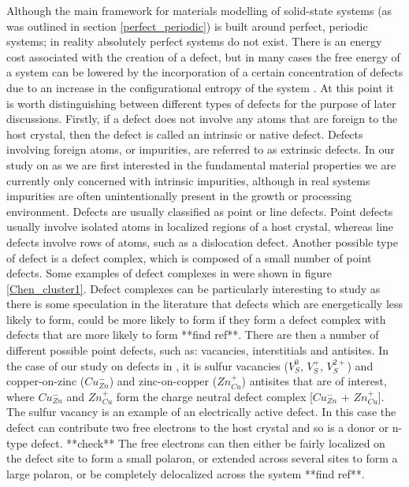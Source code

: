 Although the main framework for materials modelling of solid-state systems (as was outlined in section \ref{perfect_periodic}) is built around perfect, periodic systems; in reality absolutely perfect systems do not exist. There is an energy cost associated with the creation of a defect, but in many cases the free energy of a system can be lowered by the incorporation of a certain concentration of defects due to an increase in the configurational entropy of the system \cite{AshcroftMermin_general}. 
At this point it is worth distinguishing between different types of defects for the purpose of later discussions.
Firstly, if a defect does not involve any atoms that are foreign to the host crystal, then the defect is called an intrinsic or native defect. Defects involving foreign atoms, or impurities, are referred to as extrinsic defects. In our study on {\CZTS} as we are first interested in the fundamental material properties we are currently only concerned with intrinsic impurities, although in real systems impurities are often unintentionally present in the growth or processing environment.
Defects are usually classified as point or line defects. Point defects usually involve isolated atoms in localized regions of a host crystal, whereas line defects involve rows of atoms, such as a dislocation defect. Another possible type of defect is a defect complex, which is composed of a small number of point defects. Some examples of defect complexes in {\CZTS} were shown in figure \ref{Chen_cluster1}. Defect complexes can be particularly interesting to study as there is some speculation in the literature that defects which are energetically less likely to form, could be more likely to form if they form a defect complex with defects that are more likely to form **find ref**.
There are then a number of different possible point defects, such as: vacancies, interstitials and antisites. In the case of our study on defects in {\CZTS}, it is sulfur vacancies ($V_{S}^{0}$, $V_{S}^{+}$, $V_{S}^{2+}$) and copper-on-zinc ($Cu_{Zn}^{-}$) and zinc-on-copper ($Zn_{Cu}^{+}$) antisites that are of interest, where  $Cu_{Zn}^{-}$ and $Zn_{Cu}^{+}$ form the charge neutral defect complex [$Cu_{Zn}^{-}$ + $Zn_{Cu}^{+}$]. The sulfur vacancy is an example of an electrically active defect. In this case the defect can contribute two free electrons to the host crystal and so is a donor or n-type defect.
**check** The free electrons can then either be fairly localized on the defect site to form a small polaron, or extended across several sites to form a large polaron, or be completely delocalized across the system **find ref**.\\

